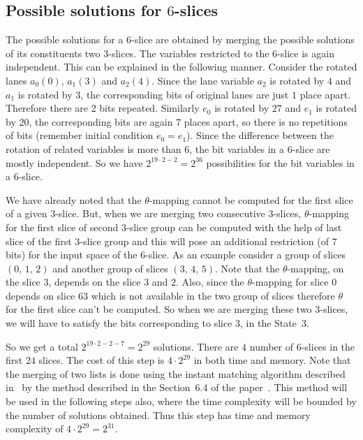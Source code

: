 \subsection{Possible solutions for  $6$-slices}
The possible solutions for a $6$-slice are obtained by merging the possible solutions of its constituents two $3$-slices. The variables restricted to the $6$-slice is again independent. This can be explained in the following manner. Consider the rotated lanes $a_0(0)$, $a_1(3)$ and $a_2(4)$. Since the lane variable $a_2$ is rotated by $4$ and $a_1$ is rotated by $3$, the corresponding bits of original lanes are just $1$ place apart. Therefore there are 2 bits repeated. Similarly $e_0$ is rotated by $27$ and $e_1$ is rotated by $20$, the corresponding bits are again $7$ places apart, so there is no repetitions of bits (remember initial condition $e_0 = e_1$). Since the difference between the rotation of related variables is more than $6$, the bit variables in a $6$-slice are mostly independent.
So we have $2^{19\cdot 2 - 2}= 2^{36}$ possibilities for the bit variables in a $6$-slice. 

We have already noted that the $\theta$-mapping cannot be computed for the first slice of a given $3$-slice. But, when we are merging two consecutive $3$-slices, $\theta$-mapping for the first slice of second $3$-slice group can be computed with the help of last slice of the first $3$-slice group and this will pose an additional restriction (of $7$ bits) for the input space of the $6$-slice.
As an example consider a group of slices $(0,\,1,\,2)$ and another group of slices $(3,\,4,\,5)$. Note that the $\theta$-mapping, on the slice $3$, depends on the slice $3$ and $2$. Also, since the $\theta$-mapping for slice $0$ depends on slice $63$ which is not available in the two group of slices therefore $\theta$ for the first slice can't be computed. So when we are merging these two $3$-slices, we will have to satisfy the bits corresponding to slice $3$, in the State~3. 

So we get a total $2^{19\cdot 2 - 2 - 7} = 2^{29}$ solutions. There are $4$ number of $6$-slices in the first $24$ slices.
The cost of this step is $4 \cdot 2^{29}$ in both time and memory. Note that the merging of two lists is done using the instant matching algorithm described in~\cite{naya2011improve} by the method described in the Section~6.4 of the paper~\cite{naya2011practical}. This method will be used in the following steps also, where the time complexity will be bounded by the number of solutions obtained. Thus this step has time and memory complexity of $4 \cdot 2^{29} = 2^{31}$.

